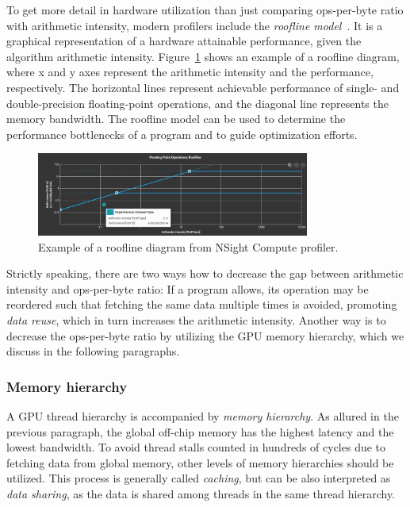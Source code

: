 To get more detail in hardware utilization than just comparing ops-per-byte ratio with arithmetic intensity, modern profilers include the \emph{roofline model}~\cite{williams2009roofline}. It is a graphical representation of a hardware attainable performance, given the algorithm arithmetic intensity. Figure~\ref{fig:roof} shows an example of a roofline diagram, where x and y axes represent the arithmetic intensity and the performance, respectively. The horizontal lines represent achievable performance of single- and double-precision floating-point operations, and the diagonal line represents the memory bandwidth. The roofline model can be used to determine the performance bottlenecks of a program and to guide optimization efforts.

\begin{figure}
    \centering
    \includegraphics[width=0.8\textwidth]{img/roofline.png}
    \caption{Example of a roofline diagram from NSight Compute profiler.}
    \label{fig:roof}
\end{figure}

Strictly speaking, there are two ways how to decrease the gap between arithmetic intensity and ops-per-byte ratio: If a program allows, its operation may be reordered such that fetching the same data multiple times is avoided, promoting \emph{data reuse}, which in turn increases the arithmetic intensity. Another way is to decrease the ops-per-byte ratio by utilizing the GPU memory hierarchy, which we discuss in the following paragraphs.

\subsubsection{Memory hierarchy}
\label{sec:memory_hier}

A GPU thread hierarchy is accompanied by \emph{memory hierarchy}. As allured in the previous paragraph, the global off-chip memory has the highest latency and the lowest bandwidth. To avoid thread stalls counted in hundreds of cycles due to fetching data from global memory, other levels of memory hierarchies should be utilized. This process is generally called \emph{caching}, but can be also interpreted as \emph{data sharing}, as the data is shared among threads in the same thread hierarchy.

